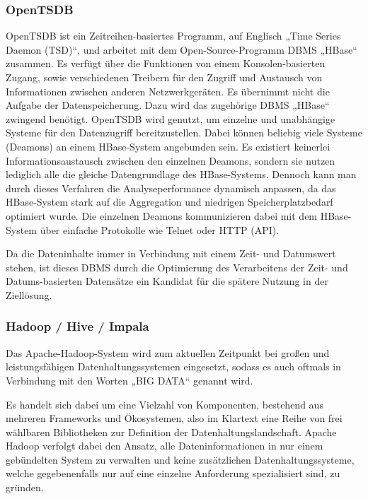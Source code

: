 \subsubsection{OpenTSDB}
\label{subsubsec:opentsdb}
OpenTSDB ist ein Zeitreihen-basiertes Programm, auf Englisch „Time Series
Daemon (TSD)“, und arbeitet mit dem Open-Source-Programm \gls{DBMS} „HBase“
zusammen. Es verfügt über die Funktionen von einem Konsolen-basierten Zugang,
sowie verschiedenen Treibern für den Zugriff und Austausch von Informationen
zwischen anderen Netzwerkgeräten. Es übernimmt nicht die Aufgabe der
Datenspeicherung. Dazu wird das zugehörige \gls{DBMS} „HBase“ zwingend
benötigt. OpenTSDB wird genutzt, um einzelne und unabhängige Systeme für den
Datenzugriff bereitzustellen. Dabei können beliebig viele Systeme (Deamons) an
einem HBase-System angebunden sein. Es existiert keinerlei
Informationsaustausch zwischen den einzelnen Deamons, sondern sie nutzen
lediglich alle die gleiche Datengrundlage des HBase-Systems. Dennoch kann man
durch dieses Verfahren die Analyseperformance dynamisch anpassen, da das
HBase-System stark auf die Aggregation und niedrigen Speicherplatzbedarf
optimiert wurde. Die einzelnen Deamons kommunizieren dabei mit dem HBase-System
über einfache Protokolle wie Telnet oder HTTP (API).

Da die Dateninhalte immer in Verbindung mit einem Zeit- und Datumswert stehen,
ist dieses \gls{DBMS} durch die Optimierung des Verarbeitens der Zeit- und
Datums-basierten Datensätze ein Kandidat für die spätere Nutzung in der
Ziellösung.
\nl%

\subsubsection{Hadoop / Hive / Impala}
\label{subsubsec:hadoop_hive_impala}
Das Apache-Hadoop-System wird zum aktuellen Zeitpunkt bei
großen und leistungsfähigen Datenhaltungssystemen eingesetzt, sodass es
auch oftmals in Verbindung mit den Worten „BIG DATA“ genannt wird.

Es handelt sich dabei um eine Vielzahl von Komponenten, bestehend aus mehreren
Frameworks und Ökosystemen, also im Klartext eine Reihe von frei wählbaren
Bibliotheken zur Definition der Datenhaltungslandschaft. Apache Hadoop verfolgt
dabei den Ansatz, alle Dateninformationen in nur einem gebündelten System zu
verwalten und keine zusätzlichen Datenhaltungssysteme, welche gegebenenfalls
nur auf eine einzelne Anforderung spezialisiert sind, zu gründen.

